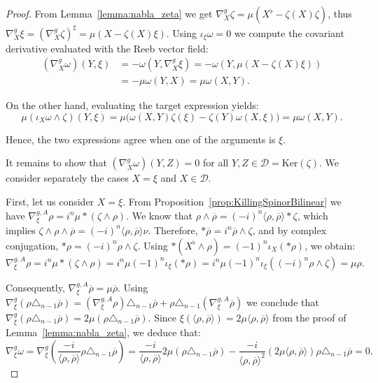 \documentclass[10pt,a4paper,twoside,reqno]{amsart}
\theoremstyle{plain}
\theoremstyle{definition}
\theoremstyle{remark}
\newcommand{\escal}[1]{\langle#1\rangle}
\renewcommand{\ker}{\mathrm{Ker}}
\begin{document}
\begin{proof}
From Lemma~\ref{lemma:nabla_zeta} we get $\nabla^g_X\zeta=\mu(X^\flat - \zeta(X)\zeta)$, thus $\nabla^g_X\xi=(\nabla^g_X\zeta)^\sharp=\mu(X - \zeta(X)\xi)$. Using $\iota_{\xi}\omega=0$ we compute the covariant derivative evaluated with the Reeb vector field:
\begin{align*}
(\nabla^g_X\omega)(Y,\xi)&=-\omega(Y,\nabla^g_X\xi)=-\omega(Y, \mu(X-\zeta(X)\xi))\\
&=-\mu\omega(Y,X)=\mu\omega(X,Y).
\end{align*}

\noindent
On the other hand, evaluating the target expression yields:
\begin{equation*}
\mu(\iota_X\omega \wedge \zeta)(Y,\xi) = \mu\big(\omega(X,Y)\zeta(\xi) - \zeta(Y)\omega(X,\xi)\big) = \mu\omega(X,Y).
\end{equation*}

\noindent
Hence, the two expressions agree when one of the arguments is $\xi$.\medskip

It remains to show that $(\nabla^g_X\omega)(Y,Z)=0$ for all $Y,Z\in\mathcal{D}=\ker(\zeta)$. We consider separately the cases $X=\xi$ and $X \in \mathcal{D}$.\medskip

First, let us consider $X=\xi$. From Proposition~\ref{prop:KillingSpinorBilinear} we have $\nabla^{g,A}_\xi\rho=i^n \mu *(\zeta\wedge\rho)$. We know that $\rho \wedge \overline{\rho} = (-i)^n \escal{\rho,\overline{\rho}}*\zeta$, which implies $\zeta \wedge \rho \wedge \overline{\rho} = (-i)^n \escal{\rho,\overline{\rho}} \nu$. Therefore, $*\overline{\rho} = i^n \overline{\rho} \wedge \zeta$, and by complex conjugation, $*\rho = (-i)^n \rho \wedge \zeta$. Using $*(X^\flat \wedge \rho) = (-1)^n \iota_X (*\rho)$, we obtain:
\begin{equation*}
\nabla^{g,A}_\xi\rho = i^n\mu *(\zeta\wedge\rho) = i^n \mu (-1)^n \iota_\xi(*\rho) = i^n \mu (-1)^n \iota_\xi((-i)^n \rho \wedge \zeta) = \mu \rho.
\end{equation*}

\noindent
Consequently, $\nabla^{g,A}_\xi\overline{\rho}=\mu\overline{\rho}$. Using $\nabla^{g}_\xi(\rho\triangle_{n-1}\overline{\rho})=(\nabla^{g,A}_\xi\rho)\triangle_{n-1}\overline{\rho}+\rho\triangle_{n-1}(\nabla^{g,A}_\xi\overline{\rho})$ we conclude that $\nabla^{g}_\xi(\rho\triangle_{n-1}\overline{\rho})=2\mu(\rho\triangle_{n-1}\overline{\rho})$. Since $\xi(\escal{\rho,\overline{\rho}})=2\mu\escal{\rho,\overline{\rho}}$ from the proof of Lemma~\ref{lemma:nabla_zeta}, we deduce that:
\begin{equation*}
\nabla^g_\xi\omega = \nabla^g_\xi \left( \frac{-i}{\escal{\rho,\overline{\rho}}} \rho\triangle_{n-1}\overline{\rho} \right) = \frac{-i}{\escal{\rho,\overline{\rho}}} 2\mu (\rho\triangle_{n-1}\overline{\rho}) - \frac{-i}{\escal{\rho,\overline{\rho}}^2} (2\mu\escal{\rho,\overline{\rho}}) \rho\triangle_{n-1}\overline{\rho} = 0.
\end{equation*}


\end{proof}
\end{document}
